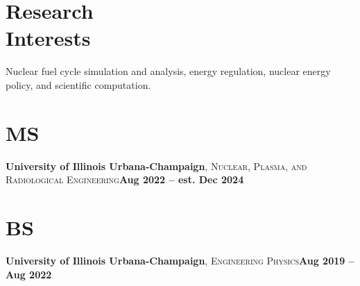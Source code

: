 \documentclass[margin,line]{resume}
\begin{document}
\begin{resume}
    \section{\mysidestyle Research\\Interests}
                Nuclear fuel cycle simulation and analysis, energy regulation, nuclear energy policy,
                and scientific computation.
    \section{\mysidestyle MS}
    \textbf{University of Illinois Urbana-Champaign}, \textsc{Nuclear, Plasma, and Radiological Engineering}\hfill\textbf{Aug 2022 -- est. Dec 2024}\vspace{-3mm}\\\vspace{-1mm}%
    \vspace{-1.5mm}
    \section{\mysidestyle BS}
    \textbf{University of Illinois Urbana-Champaign}, \textsc{Engineering Physics}\hfill\textbf{Aug 2019 -- Aug 2022}\vspace{-3mm}\\\vspace{-1mm}%
    \vspace{-1.5mm}

\end{resume}
\end{document}
